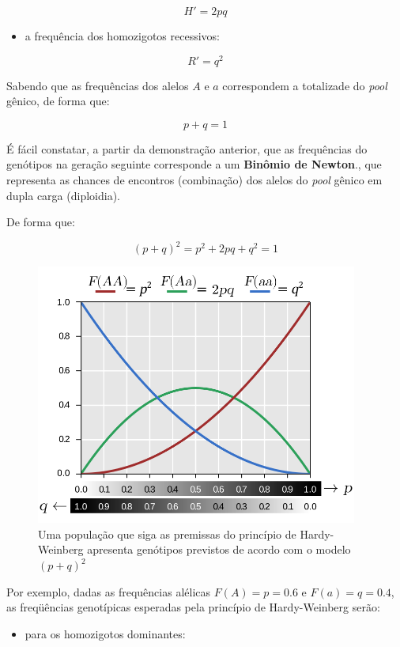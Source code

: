 \documentclass[
]{book}
\providecommand{\tightlist}{%
  \setlength{\itemsep}{0pt}\setlength{\parskip}{0pt}}
\begin{document}
\[H'=2pq\]

\begin{itemize}
\tightlist
\item
  a frequência dos homozigotos recessivos:
\end{itemize}

\[R'=q^2\]

Sabendo que as frequências dos alelos \(A\) e \(a\) correspondem a totalizade do \emph{pool} gênico, de forma que:

\[p + q = 1\]

É fácil constatar, a partir da demonstração anterior, que as frequências do genótipos na geração seguinte corresponde a um \textbf{Binômio de Newton}., que representa as chances de encontros (combinação) dos alelos do \emph{pool} gênico em dupla carga (diploidia).

De forma que:

\[\left( p + q \right)^2 = p^2 +2pq + q^2 = 1\]

\begin{figure}

{\centering \includegraphics[width=400px]{figs/hardy_weinberg_graph} 

}

\caption{Uma população que siga as premissas do princípio de Hardy-Weinberg apresenta genótipos previstos de acordo com o modelo $(p + q)^2$}\label{fig:hwgraph}
\end{figure}

Por exemplo, dadas as frequências alélicas \(F(A) = p = 0.6\) e \(F(a) = q = 0.4\), as freqüências genotípicas esperadas pela princípio de Hardy-Weinberg serão:

\begin{itemize}
\tightlist
\item
  para os homozigotos dominantes:
\end{itemize}
\end{document}
